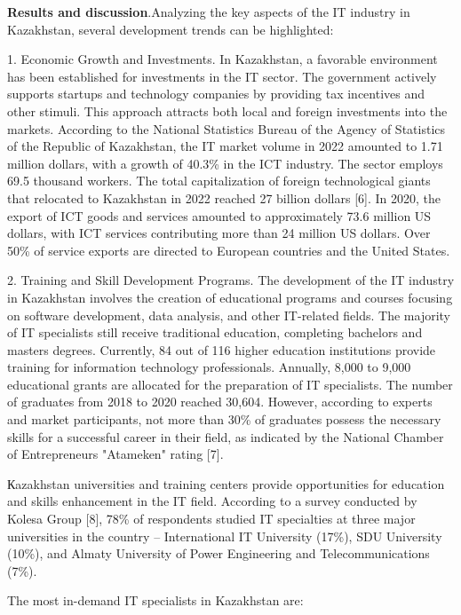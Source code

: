 {\bfseries Results and discussion}.Analyzing the key aspects of the IT
industry in Kazakhstan, several development trends can be highlighted:

1. Economic Growth and Investments. In Kazakhstan, a favorable
environment has been established for investments in the IT sector. The
government actively supports startups and technology companies by
providing tax incentives and other stimuli. This approach attracts both
local and foreign investments into the markets. According to the
National Statistics Bureau of the Agency of Statistics of the Republic
of Kazakhstan, the IT market volume in 2022 amounted to 1.71 million
dollars, with a growth of 40.3\% in the ICT industry. The sector employs
69.5 thousand workers. The total capitalization of foreign technological
giants that relocated to Kazakhstan in 2022 reached 27 billion dollars
{[}6{]}. In 2020, the export of ICT goods and services amounted to
approximately 73.6 million US dollars, with ICT services contributing
more than 24 million US dollars. Over 50\% of service exports are
directed to European countries and the United States.

2. Training and Skill Development Programs. The development of the IT
industry in Kazakhstan involves the creation of educational programs and
courses focusing on software development, data analysis, and other
IT-related fields. The majority of IT specialists still receive
traditional education, completing bachelor\textquotesingle s and
master\textquotesingle s degrees. Currently, 84 out of 116 higher
education institutions provide training for information technology
professionals. Annually, 8,000 to 9,000 educational grants are allocated
for the preparation of IT specialists. The number of graduates from 2018
to 2020 reached 30,604. However, according to experts and market
participants, not more than 30\% of graduates possess the necessary
skills for a successful career in their field, as indicated by the
National Chamber of Entrepreneurs "Atameken" rating {[}7{]}.

Кazakhstan universities and training centers provide opportunities for
education and skills enhancement in the IT field. According to a survey
conducted by Kolesa Group {[}8{]}, 78\% of respondents studied IT
specialties at three major universities in the country -- International
IT University (17\%), SDU University (10\%), and Almaty University of
Power Engineering and Telecommunications (7\%).

The most in-demand IT specialists in Kazakhstan are:

